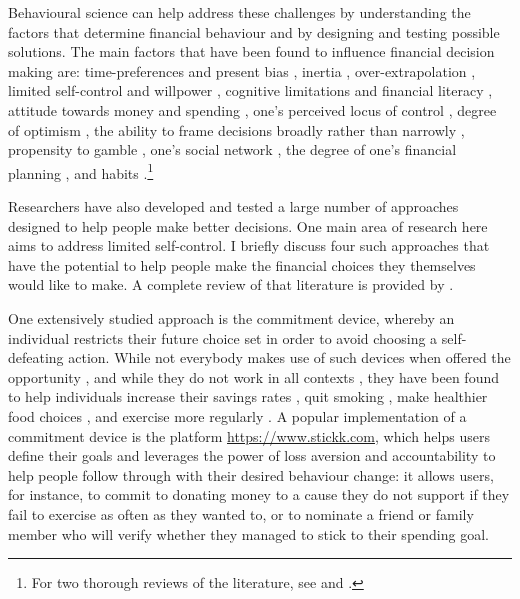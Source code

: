 Behavioural science can help address these challenges by understanding the
factors that determine financial behaviour and by designing and testing
possible solutions. The main factors that have been found to influence
financial decision making are: time-preferences and present bias
\citep{laibson1997golden, frederick2002time, read2018intertemporal,
ericson2019intertemporal, cohen2020measuring}, inertia
\citep{madrian2001power}, over-extrapolation \citep{choi2009reinforcement},
limited self-control and willpower \citep{thaler1981economic,
benhabib2005modeling, fudenberg2006dual, loewenstein2004animal,
gul2001temptation}, cognitive limitations and financial literacy
\citep{agarwal2009age, agarwal2013cognitive, korniotis2011older,
agarwal2010learning, fernandes2014financial, jorring2020financial}, attitude
towards money and spending \citep{rick2008tightwads, rick2011fatal}, one's
perceived locus of control \citep{perry2005control}, degree of optimism
\citep{puri2007optimism}, the ability to frame decisions broadly rather than
narrowly \citep{kumar2008decision}, propensity to gamble
\citep{kumar2009gambles}, one's social network \citep{bailey2018economic,
kuchler2021social}, the degree of one's financial planning
\citep{ameriks2003wealth}, and habits \citep{blumenstock2018defaults,
schaner2018persistent, de2013deposit}.\footnote{For two thorough reviews of the
literature, see \citet{agarwal2017shapes} and \citet{greenberg2019financial}.}

Researchers have also developed and tested a large number of approaches
designed to help people make better decisions. One main area of research here
aims to address limited self-control. I briefly discuss four such approaches
that have the potential to help people make the financial choices they
themselves would like to make. A complete review of that literature is provided
by \citet{duckworth2018beyond}.

One extensively studied approach is the commitment device, whereby an
individual restricts their future choice set in order to avoid choosing a
self-defeating action. While not everybody makes use of such devices when
offered the opportunity \citep{bryan2010commitment}, and while they do not work
in all contexts \citep{laibson2015don,robinson2018some}, they have been found
to help individuals increase their savings rates \citep{ashraf2006tying}, quit
smoking \citep{gine2010put}, make healthier food choices
\citep{schwartz2014healthier}, and exercise more regularly
\citep{royer2015incentives}. A popular implementation of a commitment device is
the platform \href{stickk.com}{https://www.stickk.com}, which helps users
define their goals and leverages the power of loss aversion and accountability
to help people follow through with their desired behaviour change: it allows
users, for instance, to commit to donating money to a cause they do not support
if they fail to exercise as often as they wanted to, or to nominate a friend or
family member who will verify whether they managed to stick to their spending
goal.

